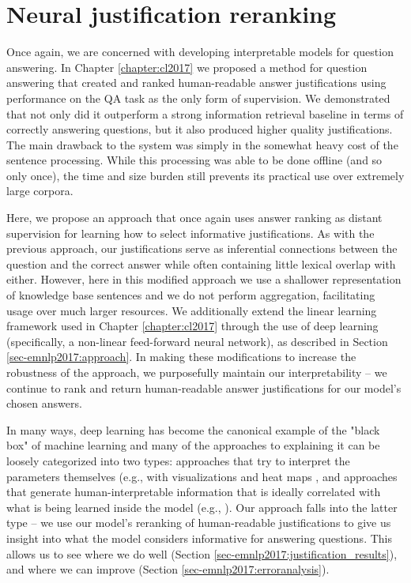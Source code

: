 \section{Neural justification reranking}
\label{sec-emnlp2017:intro}


Once again, we are concerned with developing interpretable models for question answering.  In Chapter \ref{chapter:cl2017} we proposed a method for question answering that created and ranked human-readable answer justifications using performance on the QA task as the only form of supervision.  We demonstrated that not only did it outperform a strong information retrieval baseline in terms of correctly answering questions, but it also produced higher quality justifications. The main drawback to the system was simply in the somewhat heavy cost of the sentence processing.  While this processing was able to be done offline (and so only once), the time and size burden still prevents its practical use over extremely large corpora. 

Here, we propose an approach that once again uses answer ranking as distant supervision for learning how to select informative justifications.  As with the previous approach, our justifications serve as inferential connections between the question and the correct answer while often containing little lexical overlap with either.  However, here in this  modified approach we use a  shallower representation of knowledge base sentences and we do not perform aggregation, facilitating usage over much larger resources.  
We additionally extend the linear learning framework used in Chapter \ref{chapter:cl2017} through the use of deep learning (specifically, a non-linear feed-forward neural network), as described in Section \ref{sec-emnlp2017:approach}.  
In making these modifications to increase the robustness of the approach, we purposefully maintain our interpretability -- we continue to rank and return human-readable answer justifications for our model's chosen answers.

In many ways, deep learning has become the canonical example of the "black box" of machine learning and many of the approaches to explaining it can be loosely categorized into two types: approaches that try to interpret the parameters themselves (e.g., with visualizations and heat maps \citep{Zeiler2014VisualizingAU,nips15_hermann, Li2016VisualizingAU}, and approaches that generate human-interpretable information that is ideally correlated with what is being learned inside the model (e.g., \citet{Lei2016RationalizingNP}). Our approach falls into the latter type -- 
we use our model's reranking of human-readable justifications to give us insight into what the model considers informative for answering questions.  This allows us to see where we do well (Section \ref{sec-emnlp2017:justification_results}), and where we can improve (Section  \ref{sec-emnlp2017:erroranalysis}).

